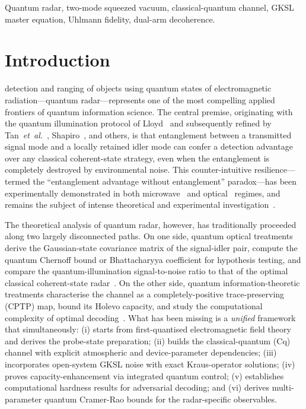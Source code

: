 \documentclass[journal]{IEEEtran}
\begin{document}
\begin{IEEEkeywords}
\sloppy
Quantum radar, two-mode squeezed vacuum, classical-quantum channel, GKSL master equation, Uhlmann fidelity, dual-arm decoherence.
\end{IEEEkeywords}

\IEEEpeerreviewmaketitle


\section{Introduction}\label{sec:intro}

 detection and ranging of objects using quantum states of electromagnetic radiation---quantum radar---represents one of the most compelling applied frontiers of quantum information science. The central premise, originating with the quantum illumination protocol of Lloyd~\cite{lloyd2008enhanced} and subsequently refined by Tan~\textit{et~al.}~\cite{tan2008quantum}, Shapiro~\cite{shapiro2009quantum}, and others, is that entanglement between a transmitted signal mode and a locally retained idler mode can confer a detection advantage over any classical coherent-state strategy, even when the entanglement is completely destroyed by environmental noise. This counter-intuitive resilience---termed the ``entanglement advantage without entanglement'' paradox---has been experimentally demonstrated in both microwave~\cite{barzanjeh2015microwave,chang2019quantum} and optical~\cite{zhang2015entanglement} regimes, and remains the subject of intense theoretical and experimental investigation~\cite{karsa2024quantum}.

The theoretical analysis of quantum radar, however, has traditionally proceeded along two largely disconnected paths. On one side, quantum optical treatments derive the Gaussian-state covariance matrix of the signal-idler pair, compute the quantum Chernoff bound or Bhattacharyya coefficient for hypothesis testing, and compare the quantum-illumination signal-to-noise ratio to that of the optimal classical coherent-state radar~\cite{luong2020quantum,renga2023quantum}. On the other side, quantum information-theoretic treatments characterise the channel as a completely-positive trace-preserving (CPTP) map, bound its Holevo capacity, and study the computational complexity of optimal decoding~\cite{nair2020quantum}. What has been missing is a \textit{unified} framework that simultaneously: (i) starts from first-quantised electromagnetic field theory and derives the probe-state preparation; (ii) builds the classical-quantum (Cq) channel with explicit atmospheric and device-parameter dependencies; (iii) incorporates open-system GKSL noise with exact Kraus-operator solutions; (iv) proves capacity-enhancement via integrated quantum control; (v) establishes computational hardness results for adversarial decoding; and (vi) derives multi-parameter quantum Cramer-Rao bounds for the radar-specific observables.
\end{document}
